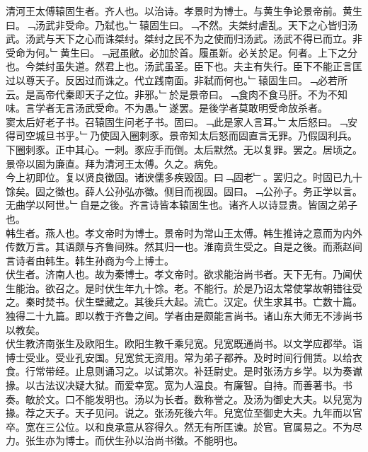 \documentclass{zhvt-classic}
\begin{document}
\hspace*{2em}清河王太傅辕固生者。齐人也。以治诗。孝景时为博士。与黄生争论景帝前。黄生曰。﹁汤武非受命。乃弑也。﹂辕固生曰。﹁不然。夫桀纣虐乱。天下之心皆归汤武。汤武与天下之心而诛桀纣。桀纣之民不为之使而归汤武。汤武不得已而立。非受命为何。﹂黄生曰。﹁冠虽敝。必加於首。履虽新。必关於足。何者。上下之分也。今桀纣虽失道。然君上也。汤武虽圣。臣下也。夫主有失行。臣下不能正言匡过以尊天子。反因过而诛之。代立践南面。非弑而何也。﹂辕固生曰。﹁必若所云。是高帝代秦即天子之位。非邪。﹂於是景帝曰。﹁食肉不食马肝。不为不知味。言学者无言汤武受命。不为愚。﹂遂罢。是後学者莫敢明受命放杀者。\\
\hspace*{2em}窦太后好老子书。召辕固生问老子书。固曰。﹁此是家人言耳。﹂太后怒曰。﹁安得司空城旦书乎。﹂乃使固入圈刺豕。景帝知太后怒而固直言无罪。乃假固利兵。下圈刺豕。正中其心。一刺。豕应手而倒。太后默然。无以复罪。罢之。居顷之。景帝以固为廉直。拜为清河王太傅。久之。病免。\\
\hspace*{2em}今上初即位。复以贤良徵固。诸谀儒多疾毁固。曰﹁固老﹂。罢归之。时固已九十馀矣。固之徵也。薛人公孙弘亦徵。侧目而视固。固曰。﹁公孙子。务正学以言。无曲学以阿世。﹂自是之後。齐言诗皆本辕固生也。诸齐人以诗显贵。皆固之弟子也。\\
\hspace*{2em}韩生者。燕人也。孝文帝时为博士。景帝时为常山王太傅。韩生推诗之意而为内外传数万言。其语颇与齐鲁间殊。然其归一也。淮南贲生受之。自是之後。而燕赵间言诗者由韩生。韩生孙商为今上博士。\\
\hspace*{2em}伏生者。济南人也。故为秦博士。孝文帝时。欲求能治尚书者。天下无有。乃闻伏生能治。欲召之。是时伏生年九十馀。老。不能行。於是乃诏太常使掌故朝错往受之。秦时焚书。伏生壁藏之。其後兵大起。流亡。汉定。伏生求其书。亡数十篇。独得二十九篇。即以教于齐鲁之间。学者由是颇能言尚书。诸山东大师无不涉尚书以教矣。\\
\hspace*{2em}伏生教济南张生及欧阳生。欧阳生教千乘兒宽。兒宽既通尚书。以文学应郡举。诣博士受业。受业孔安国。兒宽贫无资用。常为弟子都养。及时时间行佣赁。以给衣食。行常带经。止息则诵习之。以试第次。补廷尉史。是时张汤方乡学。以为奏谳掾。以古法议决疑大狱。而爱幸宽。宽为人温良。有廉智。自持。而善著书。书奏。敏於文。口不能发明也。汤以为长者。数称誉之。及汤为御史大夫。以兒宽为掾。荐之天子。天子见问。说之。张汤死後六年。兒宽位至御史大夫。九年而以官卒。宽在三公位。以和良承意从容得久。然无有所匡谏。於官。官属易之。不为尽力。张生亦为博士。而伏生孙以治尚书徵。不能明也。\\
\end{document}

